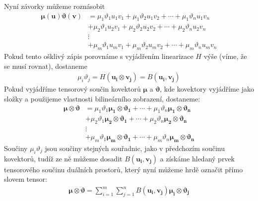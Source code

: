 \documentclass[a5paper,12pt]{amsbook}
\theoremstyle{definition}
\newcommand{\myvec}[1]{\bm{#1}}
\begin{document}
Nyní závorky můžeme roznásobit
\begin{equation*}
\begin{split}
\myvec{\mu}(\myvec{u})\myvec{\vartheta}(\myvec{v}) &=
  \mu_1\vartheta_1 u_1 v_1 + \mu_1\vartheta_2 u_1 v_2 + \cdots + \mu_1\vartheta_n u_1 v_n \\
  &+ \mu_2\vartheta_1 u_2 v_1 + \mu_2\vartheta_2 u_2 v_2 + \cdots + \mu_2\vartheta_n u_2 v_n\\
  &\vdots \\
  &+ \mu_m\vartheta_1 u_m v_1 + \mu_m\vartheta_2 u_m v_2 + \cdots + \mu_m\vartheta_n u_m v_n
\end{split}
\end{equation*}
Pokud tento ošklivý zápis porovnáme s vyjádřením linearizace $H$ výše (víme, že se musí rovnat),
dostaneme
\begin{equation*}
\begin{split}
\mu_i\vartheta_j = H(\myvec{u_i}\otimes\myvec{v_j}) = B(\myvec{u_i}, \myvec{v_j})
\end{split}
\end{equation*}
Pokud vyjádříme tensorový součin kovektorů $\myvec{\mu}$ a $\myvec{\vartheta}$, kde
kovektory vyjádříme jako složky a použijeme vlastnosti bilineárního zobrazení, dostaneme:
\begin{equation*}
\begin{split}
\myvec{\mu}\otimes\myvec{\vartheta} &=
  \mu_1\vartheta_1\myvec{\mu_1}\otimes\myvec{\vartheta_1} + \cdots 
    + \mu_1\vartheta_n\myvec{\mu_1}\otimes\myvec{\vartheta_n} \\
  & + \mu_2\vartheta_1\myvec{\mu_2}\otimes\myvec{\vartheta_1} + \cdots 
    + \mu_2\vartheta_n\myvec{\mu_2}\otimes\myvec{\vartheta_n} \\
  &\vdots \\
  & + \mu_m\vartheta_1\myvec{\mu_m}\otimes\myvec{\vartheta_1} + \cdots 
    + \mu_m\vartheta_n\myvec{\mu_m}\otimes\myvec{\vartheta_n}
\end{split}
\end{equation*}
Součiny $\mu_i\vartheta_j$ jsou součiny stejných souřadnic, jako v předchozím součinu kovektorů,
tudíž ze ně můžeme dosadit $B(\myvec{u_i}, \myvec{v_j})$ a získáme hledaný prvek tensorového
součinu duálních prostorů, který nyní můžeme hrdě označit přímo slovem tensor:
\begin{equation*}
\begin{split}
\myvec{\mu}\otimes\myvec{\vartheta} 
  = \sum_{i=1}^{m}\sum_{j=1}^{n}B(\myvec{u_i}, \myvec{v_j})\myvec{\mu_i}\otimes\myvec{\vartheta_j}
\end{split}
\end{equation*}
\end{document}
